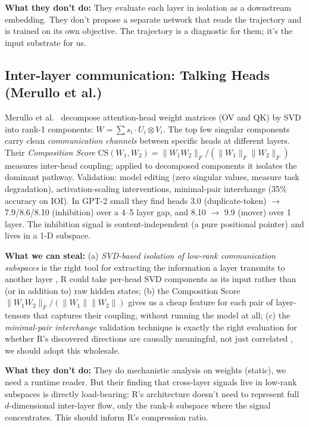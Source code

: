 \documentclass[10pt, twocolumn, a4paper]{article}
\begin{document}
\textbf{What they don't do:} They evaluate each layer in isolation as a downstream embedding. They don't propose a separate network that reads the trajectory and is trained on its own objective. The trajectory is a diagnostic for them; it's the input substrate for us.

\subsection*{Inter-layer communication: Talking Heads (Merullo et al.)}

Merullo et al.~\cite{merullo2024talking} decompose attention-head weight matrices (OV and QK) by SVD into rank-1 components: $W = \sum s_i \cdot U_i \otimes V_i$. The top few singular components carry clean \emph{communication channels} between specific heads at different layers. Their \emph{Composition Score} $\mathrm{CS}(W_1, W_2) = \|W_1 W_2\|_F / (\|W_1\|_F \|W_2\|_F)$ measures inter-head coupling; applied to decomposed components it isolates the dominant pathway. Validation: model editing (zero singular values, measure task degradation), activation-scaling interventions, minimal-pair interchange (35\% accuracy on IOI). In GPT-2 small they find heads 3.0 (duplicate-token) $\to$ 7.9/8.6/8.10 (inhibition) over a 4--5 layer gap, and 8.10 $\to$ 9.9 (mover) over 1 layer. The inhibition signal is content-independent (a pure positional pointer) and lives in a 1-D subspace.

\textbf{What we can steal:} (a) \emph{SVD-based isolation of low-rank communication subspaces} is the right tool for extracting the information a layer transmits to another layer ,  R could take per-head SVD components as its input rather than (or in addition to) raw hidden states; (b) the Composition Score $\|W_1 W_2\|_F / (\|W_1\|\|W_2\|)$ gives us a cheap feature for each pair of layer-tensors that captures their coupling, without running the model at all; (c) the \emph{minimal-pair interchange} validation technique is exactly the right evaluation for whether R's discovered directions are causally meaningful, not just correlated ,  we should adopt this wholesale.

\textbf{What they don't do:} They do mechanistic analysis on weights (static), we need a runtime reader. But their finding that cross-layer signals live in low-rank subspaces is directly load-bearing: R's architecture doesn't need to represent full $d$-dimensional inter-layer flow, only the rank-$k$ subspace where the signal concentrates. This should inform R's compression ratio.
\end{document}
